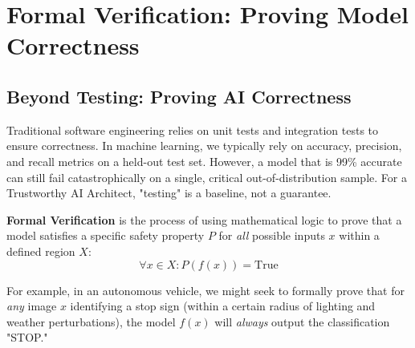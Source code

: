 
\chapter{Formal Verification: Proving Model Correctness}
\label{ch:formal-verification}


\section{Beyond Testing: Proving AI Correctness}
\label{sec:beyond_testing_ch20}

Traditional software engineering relies on unit tests and integration tests to ensure correctness. In machine learning, we typically rely on accuracy, precision, and recall metrics on a held-out test set. However, a model that is 99\% accurate can still fail catastrophically on a single, critical out-of-distribution sample. For a Trustworthy AI Architect, "testing" is a baseline, not a guarantee.

\textbf{Formal Verification} is the process of using mathematical logic to prove that a model satisfies a specific safety property $P$ for \textit{all} possible inputs $x$ within a defined region $X$:
\begin{equation}
\forall x \in X : P(f(x)) = \text{True}
\end{equation}

For example, in an autonomous vehicle, we might seek to formally prove that for \textit{any} image $x$ identifying a stop sign (within a certain radius of lighting and weather perturbations), the model $f(x)$ will \textit{always} output the classification "STOP."

